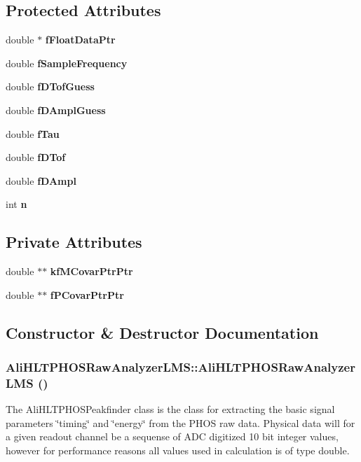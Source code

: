 \subsection*{Protected Attributes}
\begin{CompactItemize}
\item 
double $\ast$ {\bf f\-Float\-Data\-Ptr}
\item 
double {\bf f\-Sample\-Frequency}
\item 
double {\bf f\-DTof\-Guess}
\item 
double {\bf f\-DAmpl\-Guess}
\item 
double {\bf f\-Tau}
\item 
double {\bf f\-DTof}
\item 
double {\bf f\-DAmpl}
\item 
int {\bf n}
\end{CompactItemize}
\subsection*{Private Attributes}
\begin{CompactItemize}
\item 
double $\ast$$\ast$ {\bf kf\-MCovar\-Ptr\-Ptr}
\item 
double $\ast$$\ast$ {\bf f\-PCovar\-Ptr\-Ptr}
\end{CompactItemize}


\subsection{Constructor \& Destructor Documentation}
\subsubsection{\setlength{\rightskip}{0pt plus 5cm}Ali\-HLTPHOSRaw\-Analyzer\-LMS::Ali\-HLTPHOSRaw\-Analyzer\-LMS ()}\label{classAliHLTPHOSRawAnalyzerLMS_AliHLTPHOSRawAnalyzerLMSa0}


The Ali\-HLTPHOSPeakfinder class is the class for extracting the basic signal parameters \char`\"{}timing\char`\"{} and \char`\"{}energy\char`\"{} from the PHOS raw data. Physical data will for a given readout channel be a sequense of ADC digitized 10 bit integer values, however for performance reasons all values used in calculation is of type double. 

